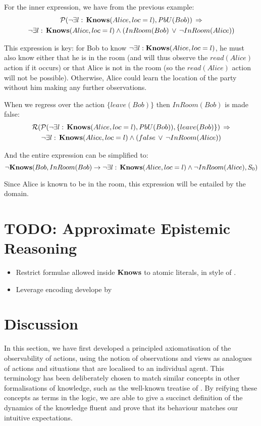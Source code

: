 For the inner expression, we have from the previous example:\begin{multline*}
\mathcal{P}(\neg\exists l:\,\mathbf{Knows}(Alice,loc=l),PbU(Bob))\,\Rightarrow\\
\neg\exists l:\,\mathbf{Knows}(Alice,loc=l)\wedge\left(InRoom(Bob)\,\vee\,\neg InRoom(Alice)\right)\end{multline*}


This expression is key: for Bob to know $\neg\exists l:\mathbf{Knows}(Alice,loc=l)$,
he must also know either that he is in the room (and will thus observe
the $read(Alice)$ action if it occurs) or that Alice is not in the
room (so the $read(Alice)$ action will not be possible). Otherwise,
Alice could learn the location of the party without him making any
further observations.

When we regress over the action $\{leave(Bob)\}$ then $InRoom(Bob)$
is made false:\begin{multline*}
\mathcal{R}(\mathcal{P}(\neg\exists l:\,\mathbf{Knows}(Alice,loc=l),PbU(Bob)),\{leave(Bob)\})\,\Rightarrow\\
\neg\exists l:\,\mathbf{Knows}(Alice,loc=l)\wedge\left(false\,\vee\,\neg InRoom(Alice)\right)\end{multline*}


And the entire expression can be simplified to:\[
\neg\mathbf{Knows}(Bob,InRoom(Bob)\rightarrow\neg\exists l:\,\mathbf{Knows}(Alice,loc=l)\wedge\neg InRoom(Alice),S_{0})\]


Since Alice is known to be in the room, this expression will be entailed
by the domain.


\section{TODO: Approximate Epistemic Reasoning\label{sec:Knowledge:Approximate}}

\begin{itemize}
\item Restrict formulae allowed inside $\mathbf{Knows}$ to atomic literals, in
style of \citet{demolombe00tractable_sc_belief}. 
\item Leverage encoding develope by \citet{petrick02knowledge_equivalence} 
\end{itemize}

\section{Discussion\label{sec:Knowledge:Discussion}}

In this section, we have first developed a principled axiomatisation
of the observability of actions, using the notion of observations
and views as analogues of actions and situations that are localised
to an individual agent. This terminology has been deliberately chosen
to match similar concepts in other formalisations of knowledge, such
as the well-known treatise of \citet{halpern90knowledge_distrib}.
By reifying these concepts as terms in the logic, we are able to give
a succinct definition of the dynamics of the knowledge fluent and
prove that its behaviour matches our intuitive expectations.


